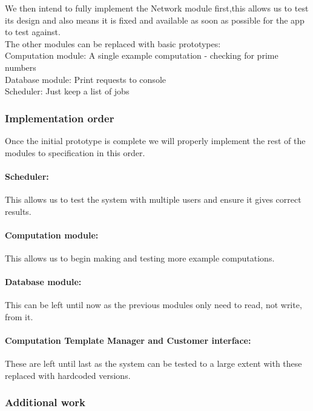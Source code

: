 \documentclass[
  twoside,
  10pt, a4paper
]{article}
\begin{document}
We then intend to fully implement the Network module first,this allows us to test its design and also means it is fixed and available as soon as possible for the app to test against.\\

The other modules can be replaced with basic prototypes:\\
Computation module: A single example computation - checking for prime numbers\\
Database module: Print requests to console\\
Scheduler: Just keep a list of jobs\\


\subsubsection{Implementation order}

Once the initial prototype is complete we will properly implement the rest of the modules to specification in this order.

\paragraph{Scheduler:} This allows us to test the system with multiple users and ensure it gives correct results.

\paragraph{Computation module:} This allows us to begin making and testing more example computations.

\paragraph{Database module:} This can be left until now as the previous modules only need to read, not write, from it.

\paragraph{Computation Template Manager and Customer interface:} These are left until last as the system can be tested to a large extent with these replaced with hardcoded versions.


\subsubsection{Additional work}
\end{document}
